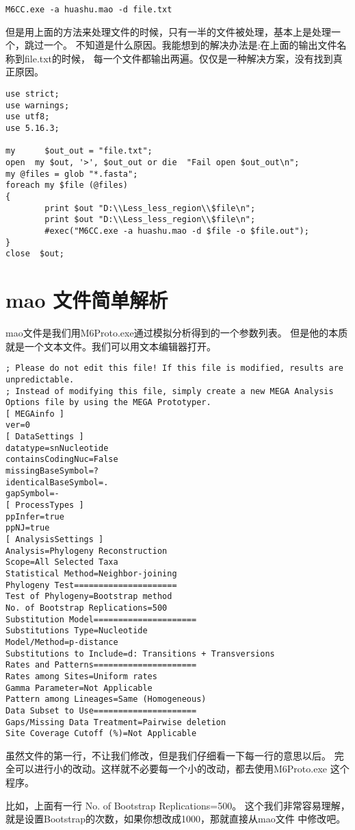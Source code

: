 \documentclass{ctexart}
\begin{document}
\lstset{frame=single,frameround=tttt,language=Perl}
\begin{lstlisting}
M6CC.exe -a huashu.mao -d file.txt
\end{lstlisting}
但是用上面的方法来处理文件的时候，只有一半的文件被处理，基本上是处理一个，跳过一个。
不知道是什么原因。我能想到的解决办法是:在上面的输出文件名称到file.txt的时候，
每一个文件都输出两遍。仅仅是一种解决方案，没有找到真正原因。

\lstset{frame=single,frameround=tttt,language=Perl}
\begin{lstlisting}
use strict;
use warnings;
use utf8;
use 5.16.3;

my      $out_out = "file.txt";
open  my $out, '>', $out_out or die  "Fail open $out_out\n";
my @files = glob "*.fasta";
foreach my $file (@files)
{
        print $out "D:\\Less_less_region\\$file\n";
        print $out "D:\\Less_less_region\\$file\n";
        #exec("M6CC.exe -a huashu.mao -d $file -o $file.out");
}
close  $out;
\end{lstlisting}
\section{mao 文件简单解析}
\label{sec-4}

mao文件是我们用M6Proto.exe通过模拟分析得到的一个参数列表。
但是他的本质就是一个文本文件。我们可以用文本编辑器打开。

\lstset{frame=single,frameround=tttt,language=Perl}
\begin{lstlisting}
; Please do not edit this file! If this file is modified, results are unpredictable.
; Instead of modifying this file, simply create a new MEGA Analysis Options file by using the MEGA Prototyper.
[ MEGAinfo ]
ver=0
[ DataSettings ]
datatype=snNucleotide
containsCodingNuc=False
missingBaseSymbol=?
identicalBaseSymbol=.
gapSymbol=-
[ ProcessTypes ]
ppInfer=true
ppNJ=true
[ AnalysisSettings ]
Analysis=Phylogeny Reconstruction
Scope=All Selected Taxa
Statistical Method=Neighbor-joining
Phylogeny Test=====================
Test of Phylogeny=Bootstrap method
No. of Bootstrap Replications=500
Substitution Model=====================
Substitutions Type=Nucleotide
Model/Method=p-distance
Substitutions to Include=d: Transitions + Transversions
Rates and Patterns=====================
Rates among Sites=Uniform rates
Gamma Parameter=Not Applicable
Pattern among Lineages=Same (Homogeneous)
Data Subset to Use=====================
Gaps/Missing Data Treatment=Pairwise deletion
Site Coverage Cutoff (%)=Not Applicable
\end{lstlisting}
虽然文件的第一行，不让我们修改，但是我们仔细看一下每一行的意思以后。
完全可以进行小的改动。这样就不必要每一个小的改动，都去使用M6Proto.exe
这个程序。

比如，上面有一行 No. of Bootstrap Replications=500。
这个我们非常容易理解，就是设置Bootstrap的次数，如果你想改成1000，那就直接从mao文件
中修改吧。
\end{document}
